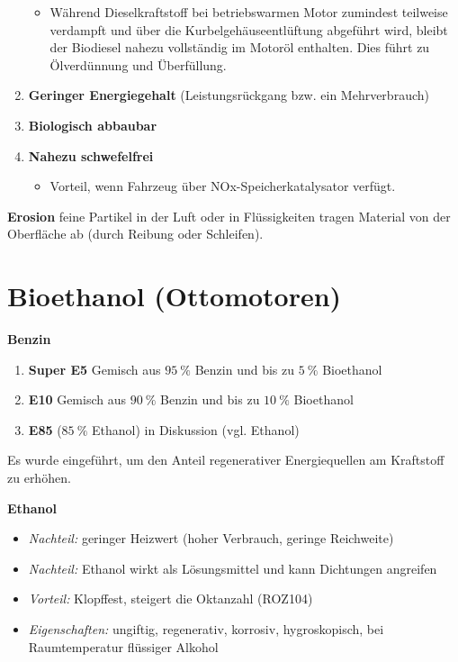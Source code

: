 \begin{enumerate}
  \begin{itemize}
  \item
    Während Dieselkraftstoff bei betriebswarmen Motor zumindest
    teilweise verdampft und über die Kurbelgehäuseentlüftung abgeführt
    wird, bleibt der Biodiesel nahezu vollständig im Motoröl enthalten.
    Dies führt zu Ölverdünnung und Überfüllung.
  \end{itemize}
\item
  \textbf{Geringer Energiegehalt} (Leistungsrückgang bzw. ein
  Mehrverbrauch)
\item
  \textbf{Biologisch abbaubar}
\item
  \textbf{Nahezu schwefelfrei}

  \begin{itemize}
  \item
    Vorteil, wenn Fahrzeug über NOx-Speicherkatalysator verfügt.
  \end{itemize}
\end{enumerate}

\textbf{Erosion} feine Partikel in der Luft oder in Flüssigkeiten tragen
Material von der Oberfläche ab (durch Reibung oder Schleifen).

\section{Bioethanol (Ottomotoren)}\label{bioethanol-ottomotoren}

\textbf{Benzin}

\begin{enumerate}
\item
  \textbf{Super E5} Gemisch aus $95~\%$ Benzin und bis zu $5~\%$
  Bioethanol
\item
  \textbf{E10} Gemisch aus $90~\%$ Benzin und bis zu $10~\%$
  Bioethanol
\item
  \textbf{E85} ($85~\%$ Ethanol) in Diskussion (vgl. Ethanol)
\end{enumerate}

Es wurde eingeführt, um den Anteil regenerativer Energiequellen am
Kraftstoff zu erhöhen.

\textbf{Ethanol}

\begin{itemize}
\item
  \emph{Nachteil:} geringer Heizwert (hoher Verbrauch, geringe
  Reichweite)
\item
  \emph{Nachteil:} Ethanol wirkt als Lösungsmittel und kann Dichtungen
  angreifen
\item
  \emph{Vorteil:} Klopffest, steigert die Oktanzahl (ROZ104)
\item
  \emph{Eigenschaften:} ungiftig, regenerativ, korrosiv, hygroskopisch,
  bei Raumtemperatur flüssiger Alkohol
\end{itemize}

